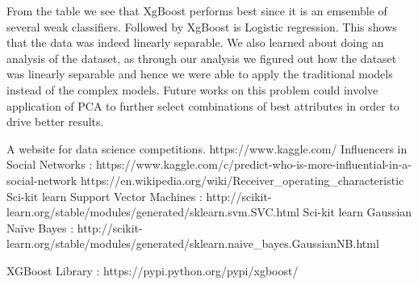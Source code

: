 \documentclass[conference]{IEEEtran}
\numberwithin{equation}{section}
\numberwithin{figure}{section}
\numberwithin{table}{section}
\begin{document}
From the table we see that XgBoost performs best since it is an emsemble of several weak classifiers. Followed by XgBoost is Logistic regression. This shows that the data was indeed linearly separable. We also learned about doing an analysis of the dataset, as through our analysis we figured out how the dataset was linearly separable and hence we were able to apply the traditional models instead of the complex models.
Future works on this problem could involve application of PCA to further select combinations of best attributes in order to drive better results.

\begin{thebibliography}{1}
A website for data science competitions. https://www.kaggle.com/
Influencers in Social Networks : https://www.kaggle.com/c/predict-who-is-more-influential-in-a-social-network
https://en.wikipedia.org/wiki/Receiver\_operating\_characteristic
Sci-kit learn Support Vector Machines : http://scikit-learn.org/stable/modules/generated/sklearn.svm.SVC.html
Sci-kit learn Gaussian Na{\"i}ve Bayes : http://scikit-learn.org/stable/modules/generated/sklearn.naive\_bayes.GaussianNB.html

XGBoost Library : https://pypi.python.org/pypi/xgboost/
\end{thebibliography}

\end{document}
